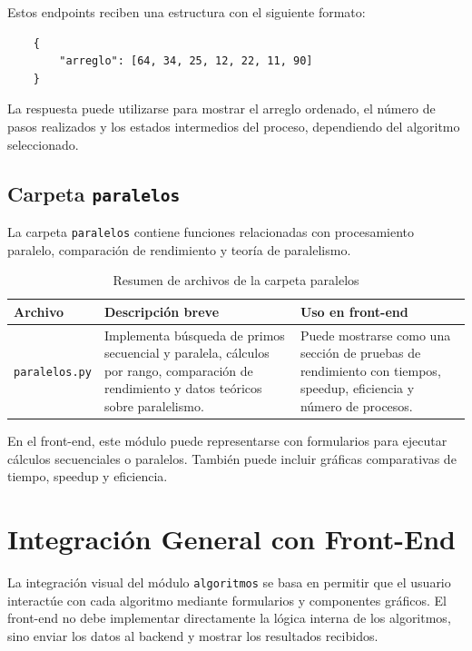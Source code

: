 \documentclass[12pt]{article}
\begin{document}
Estos endpoints reciben una estructura con el siguiente formato:

\begin{verbatim}
	{
		"arreglo": [64, 34, 25, 12, 22, 11, 90]
	}
\end{verbatim}

La respuesta puede utilizarse para mostrar el arreglo ordenado, el número de pasos realizados y los estados intermedios del proceso, dependiendo del algoritmo seleccionado.
	
	\subsection{Carpeta \texttt{paralelos}}
	
	La carpeta \texttt{paralelos} contiene funciones relacionadas con procesamiento paralelo, comparación de rendimiento y teoría de paralelismo.
	
	\begin{table}[H]
		\centering
		\begin{tabular}{|p{4cm}|p{5cm}|p{5cm}|}
			\hline
			\textbf{Archivo} & \textbf{Descripción breve} & \textbf{Uso en front-end} \\
			\hline
			\texttt{paralelos.py} & Implementa búsqueda de primos secuencial y paralela, cálculos por rango, comparación de rendimiento y datos teóricos sobre paralelismo. & Puede mostrarse como una sección de pruebas de rendimiento con tiempos, speedup, eficiencia y número de procesos. \\
			\hline
		\end{tabular}
		\caption{Resumen de archivos de la carpeta paralelos}
	\end{table}
	
	En el front-end, este módulo puede representarse con formularios para ejecutar cálculos secuenciales o paralelos. También puede incluir gráficas comparativas de tiempo, speedup y eficiencia.
	
	\section{Integración General con Front-End}
	
	La integración visual del módulo \texttt{algoritmos} se basa en permitir que el usuario interactúe con cada algoritmo mediante formularios y componentes gráficos. El front-end no debe implementar directamente la lógica interna de los algoritmos, sino enviar los datos al backend y mostrar los resultados recibidos.
	
\end{document}
